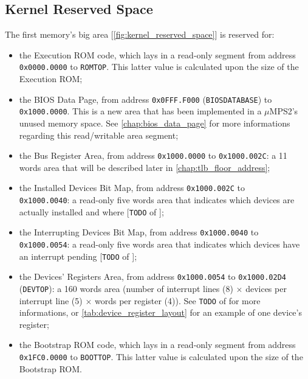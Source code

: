 \documentclass[12pt,a4paper,openright,twoside]{report}
\begin{document}
\subsection{Kernel Reserved Space}
\label{chap:kernel_reserved_space}
	The first memory's big area [\autoref{fig:kernel_reserved_space}] is reserved for:
	\begin{itemize}  
	\item the Execution ROM code, which lays in a read-only segment from address \texttt{0x0000.0000} to \texttt{ROMTOP}. This latter value is calculated upon the size of the Execution ROM;
	\item the BIOS Data Page, from address \texttt{0x0FFF.F000} (\texttt{BIOSDATABASE}) to \texttt{0x1000.0000}. This is a new area that has been implemented in a $\mu$MPS2's unused memory space.
	See \autoref{chap:bios_data_page} for more informations regarding this read/writable area segment;
	\item the Bus Register Area, from address \texttt{0x1000.0000} to \texttt{0x1000.002C}: a 11 words area that will be described later in \autoref{chap:tlb_floor_address};
	\item the Installed Devices Bit Map, from address \texttt{0x1000.002C} to \\ \texttt{0x1000.0040}: a read-only five words area that indicates which devices are actually installed and where [\texttt{TODO} of \cite{pops}];
	\item the Interrupting Devices Bit Map, from address \texttt{0x1000.0040} to \\ \texttt{0x1000.0054}: a read-only five words area that indicates which devices have an interrupt pending [\texttt{TODO} of \cite{pops}];
  \item the Devices' Registers Area, from address \texttt{0x1000.0054} to \texttt{0x1000.02D4} (\texttt{DEVTOP}): a 160 words area (number of interrupt lines (8) $\times$ devices per interrupt line (5) $\times$  words per register (4)). See \texttt{TODO} of \cite{pops} for more informations, or \autoref{tab:device_register_layout} for an example of one device's register;
  \item the Bootstrap ROM code, which lays in a read-only segment from address \texttt{0x1FC0.0000} to \texttt{BOOTTOP}. This latter value is calculated upon the size of the Bootstrap ROM.
	\end{itemize}
\end{document}
